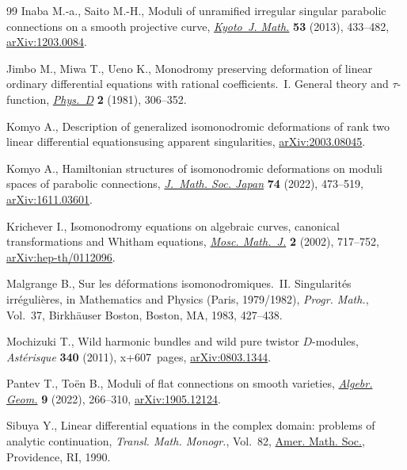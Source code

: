 \documentclass[pdftex]{sigma}
\numberwithin{equation}{section}
\begin{document}
\begin{thebibliography}{99}
Inaba M.-a., Saito M.-H., Moduli of unramified irregular singular parabolic
 connections on a smooth projective curve, \href{https://doi.org/10.1215/21562261-2081261}{\textit{Kyoto~J. Math.}} \textbf{53}
 (2013), 433--482, \href{https://arxiv.org/abs/1203.0084}{arXiv:1203.0084}.

Jimbo M., Miwa T., Ueno K., Monodromy preserving deformation of linear ordinary
 differential equations with rational coefficients.~{I}. {G}eneral theory and
 {$\tau $}-function, \href{https://doi.org/10.1016/0167-2789(81)90013-0}{\textit{Phys.~D}} \textbf{2} (1981), 306--352.

Komyo A., Description of generalized isomonodromic deformations of rank two
 linear differential equationsusing apparent singularities,
 \href{https://arxiv.org/abs/2003.08045}{arXiv:2003.08045}.

Komyo A., Hamiltonian structures of isomonodromic deformations on moduli spaces
 of parabolic connections, \href{https://doi.org/10.2969/jmsj/83858385}{\textit{J.~Math. Soc. Japan}} \textbf{74} (2022),
 473--519, \href{https://arxiv.org/abs/1611.03601}{arXiv:1611.03601}.

Krichever I., Isomonodromy equations on algebraic curves, canonical
 transformations and {W}hitham equations, \href{https://doi.org/10.17323/1609-4514-2002-2-4-717-752}{\textit{Mosc. Math.~J.}} \textbf{2}
 (2002), 717--752, \href{https://arxiv.org/abs/hep-th/0112096}{arXiv:hep-th/0112096}.

Malgrange B., Sur les d\'eformations isomonodromiques.~{II}. {S}ingularit\'es
 irr\'eguli\`eres, in Mathematics and Physics ({P}aris, 1979/1982),
 \textit{Progr. Math.}, Vol.~37, Birkh\"auser Boston, Boston, MA, 1983,
 427--438.

Mochizuki T., Wild harmonic bundles and wild pure twistor {$D$}-modules,
 \textit{Ast\'erisque} \textbf{340} (2011), x+607~pages, \href{https://arxiv.org/abs/0803.1344}{arXiv:0803.1344}.

Pantev T., To\"en B., Moduli of flat connections on smooth varieties,
 \href{https://doi.org/10.14231/ag-2022-009}{\textit{Algebr. Geom.}} \textbf{9} (2022), 266--310, \href{https://arxiv.org/abs/1905.12124}{arXiv:1905.12124}.

Sibuya Y., Linear differential equations in the complex domain: problems of
 analytic continuation, \textit{Transl. Math. Monogr.}, Vol.~82, \href{https://doi.org/10.1090/mmono/082}{Amer. Math.
 Soc.}, Providence, RI, 1990.


\end{thebibliography}
\end{document}
